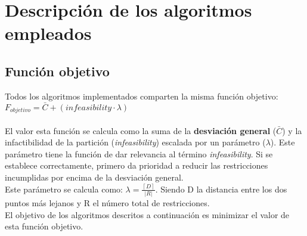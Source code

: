 \chapter{Descripción de los algoritmos empleados}
\section{Función objetivo}

Todos los algoritmos implementados comparten la misma función objetivo: $ F_{objetivo} = \bar{C} + (infeasibility \cdot \lambda) $\\
\\
El valor esta función se calcula como la suma de la \textbf{desviación general} ($ \bar{C} $) y la infactibilidad de la partición (\emph{infeasibility}) escalada por un parámetro ($ \lambda $). Este parámetro tiene la función de dar relevancia al término \emph{infeasibility}. Si se establece correctamente, primero da prioridad a reducir las restricciones incumplidas por encima de la desviación general.\\ Este parámetro se calcula como: $ \lambda = \frac{\left \lceil D \right \rceil}{\left | R \right |}$. Siendo D la distancia entre los dos puntos más lejanos y R el número total de restricciones. \\
El objetivo de los algoritmos descritos a continuación es minimizar el valor de esta función objetivo.

